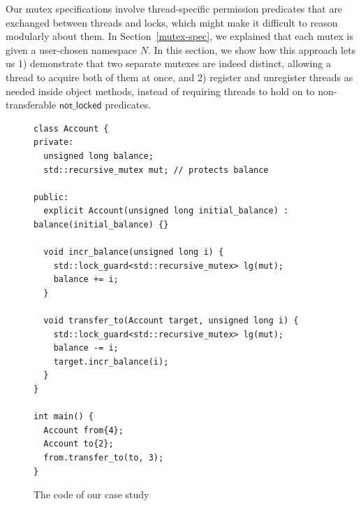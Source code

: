 \documentclass[acmsmall,screen,review,anonymous]{acmart}
\begin{document}
Our mutex specifications involve thread-specific permission predicates that are exchanged between threads and locks, which might make it difficult to reason modularly about them. In Section~\ref{mutex-spec}, we explained that each mutex is given a user-chosen namespace $N$. In this section, we show how this approach lets us 1) demonstrate that two separate mutexes are indeed distinct, allowing a thread to acquire both of them at once, and 2) register and unregister threads as needed inside object methods, instead of requiring threads to hold on to non-transferable $\mathsf{not\_locked}$ predicates.

\begin{figure}[htb]
\begin{lstlisting}
class Account {
private:
  unsigned long balance;
  std::recursive_mutex mut; // protects balance

public:
  explicit Account(unsigned long initial_balance) : balance(initial_balance) {}

  void incr_balance(unsigned long i) {
    std::lock_guard<std::recursive_mutex> lg(mut);
    balance += i;
  }

  void transfer_to(Account target, unsigned long i) {
    std::lock_guard<std::recursive_mutex> lg(mut);
    balance -= i;
    target.incr_balance(i);
  }
}

int main() {
  Account from{4};
  Account to{2};
  from.transfer_to(to, 3);
}
\end{lstlisting}
\caption{The code of our case study}
\label{transfer}
\end{figure}
\end{document}
